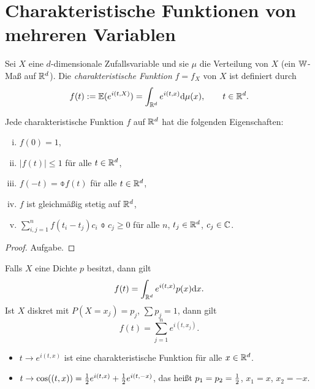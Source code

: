 \setcounter{chapter}{6}
\chapter{Charakteristische Funktionen von mehreren Variablen}
\renewcommand{\thethm}{G.\arabic{thm}}

\begin{defn}
  Sei $X$ eine $d$-dimensionale Zufallsvariable und sie $\mu$ die Verteilung von
  $X$ (ein $\mathbb{W}$-Maß auf $\mathbb{R}^d$). Die \emph{charakteristische Funktion} $f =
  f_X$ von $X$ ist definiert durch
  \[ f(t) := \mathbb{E}( e^{i(t,X)}) = \int_{\mathbb{R}^d} e^{i(t,x)} \mathrm{d} \mu(x),
    \qquad t \in \mathbb{R}^d. \]
\end{defn}

\begin{thm}
  Jede charakteristische Funktion $f$ auf $\mathbb{R}^d$ hat die folgenden
  Eigenschaften:
  \begin{enumerate}[(i)]
  \item $f(0) = 1$,
  \item $|f(t)| \le 1$ für alle $t \in \mathbb{R}^d$,
  \item $f(-t) = \obar{f(t)}$ für alle $t \in \mathbb{R}^d$,
  \item $f$ ist gleichmäßig stetig auf $\mathbb{R}^d$,
  \item $\sum_{i,j=1}^n f(t_i - t_j) c_i \obar{c_j} \ge 0$ für alle $n$, $t_j
    \in \mathbb{R}^d$, $c_j \in \mathbb{C}$.
  \end{enumerate}
\end{thm}

\begin{proof}
  Aufgabe.
\end{proof}

\begin{rmrk*}
  Falls $X$ eine Dichte $p$ besitzt, dann gilt
  \[ f(t) = \int_{\mathbb{R}^d} e^{i(t,x)} p(x) \mathrm{d} x. \]
  Ist $X$ diskret mit $P(X = x_j) = p_j$, $\sum p_j = 1$, dann gilt
  \[ f(t) = \sum_{j=1}^n e^{i(t,x_j)}. \]
\end{rmrk*}

\begin{exmp*}
  \begin{itemize}
  \item $t \to e^{i(t,x)}$ ist eine charakteristische Funktion für alle $x \in
    \mathbb{R}^d$.
  \item $t \to \cos((t,x)) = \frac{1}{2} e^{i(t,x)} + \frac{1}{2} e^{i(t,-x)}$,
    das heißt $p_1 = p_2 = \frac{1}{2}$, $x_1 = x$, $x_2 = -x$.
  \end{itemize}
\end{exmp*}

